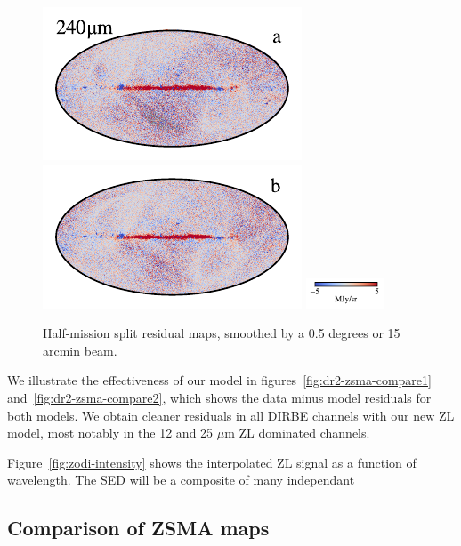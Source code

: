 \documentclass[twocolumn]{aa}
\begin{document}
\begin{figure}[t]
    \includegraphics[width=0.22\linewidth]{figs/compare_zodi_res/cosmoglobe_res_10a.pdf}%
    \includegraphics[width=0.22\linewidth]{figs/compare_zodi_res/cosmoglobe_res_10b.pdf}%
    \includegraphics[width=23mm,angle=90]{figs/compare_zodi_res/cbar_10.pdf}%
    \caption{Half-mission split residual maps, smoothed by a 0.5 degrees or 15 arcmin beam.}
    \label{fig:half-mission-res2}
\end{figure}



We illustrate the effectiveness of our model in figures~\ref{fig:dr2-zsma-compare1} 
and~\ref{fig:dr2-zsma-compare2}, which shows the data minus model residuals for both models.
We obtain cleaner residuals in all DIRBE channels with our new ZL model, most notably in the 12 and 25 $\mu$m  
ZL dominated channels.

Figure~\ref{fig:zodi-intensity} shows the interpolated ZL signal as a function of wavelength. The SED will be a composite of many independant 


\subsection{Comparison of ZSMA maps}
\end{document}
